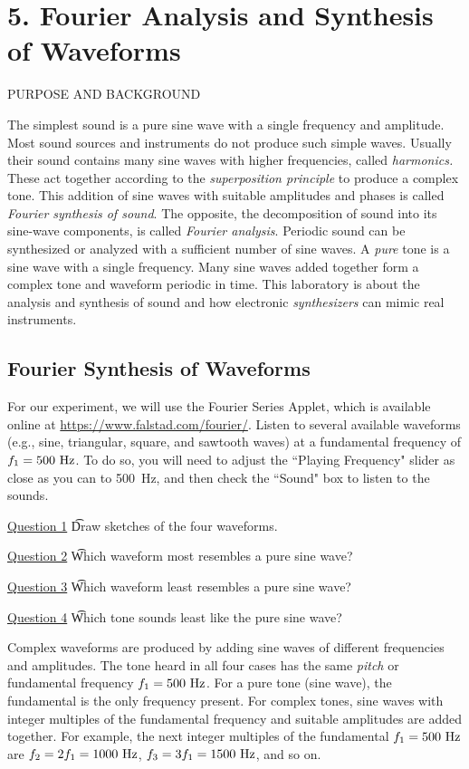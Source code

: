 \documentclass[11pt]{NSF}
\begin{document}
     
\section{5. Fourier Analysis and Synthesis of Waveforms}

PURPOSE AND BACKGROUND

The simplest sound is a pure sine wave with a single frequency and amplitude.
Most sound sources and instruments do not produce such simple waves. Usually
their sound contains many sine waves with higher frequencies, called {\em harmonics.}
These act together according to the {\em superposition principle} to produce a
complex tone. This addition of sine waves with suitable amplitudes and phases
is called {\em Fourier synthesis of sound}. 
The opposite, the decomposition of sound
into its sine-wave components, is called {\em Fourier analysis}. 
Periodic sound can
be synthesized or analyzed with a sufficient number of sine waves. 
A {\em pure} tone is a sine wave with a single frequency. 
Many sine waves added together form a
complex tone and waveform periodic in time. This laboratory is about the
analysis and synthesis of sound and how electronic 
{\em synthesizers} can mimic real instruments.

\subsection{Fourier Synthesis of Waveforms}

For our experiment, we will use the 
Fourier Series Applet, which is available online at 
\url{https://www.falstad.com/fourier/}.
Listen to several available waveforms (e.g.,  sine, triangular, 
square, and sawtooth waves) at a fundamental frequency of 
$f_1 = 500~{\rm Hz}$.
To do so, you will need to adjust the ``Playing Frequency" 
slider as close as you can to 500~Hz,  
and then check the ``Sound" box to listen to the sounds.


\underline{Question 1} \t Draw sketches of the four waveforms.

\underline{Question 2} \t Which waveform most resembles a pure sine wave?

\underline{Question 3} \t Which waveform least resembles a pure sine wave?

\underline{Question 4} \t Which tone sounds least like the pure sine wave?


Complex waveforms are produced by adding sine waves of different frequencies
and amplitudes. The tone heard in all four cases has the same {\em pitch} or
fundamental frequency $f_1= 500~{\rm Hz}$. For a pure tone (sine wave), the fundamental
is the only frequency present. For complex tones, sine waves with integer
multiples of the fundamental frequency and suitable amplitudes are added
together. For example, the next integer multiples of the fundamental 
$f_1 = 500~{\rm Hz}$ are 
$f_2 = 2 f_1= 1000~{\rm Hz}$, 
$f_3 = 3 f_1 = 1500~{\rm Hz}$, and so on.
\end{document}

